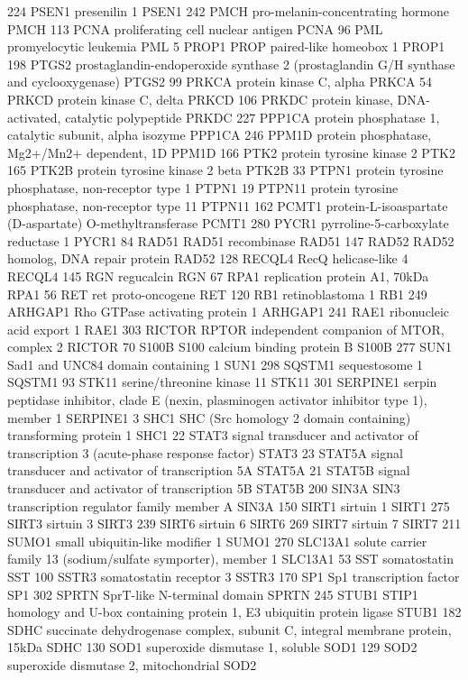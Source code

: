 224	PSEN1	presenilin 1	PSEN1
242	PMCH	pro-melanin-concentrating hormone	PMCH
113	PCNA	proliferating cell nuclear antigen	PCNA
96	PML	promyelocytic leukemia	PML
5	PROP1	PROP paired-like homeobox 1	PROP1
198	PTGS2	prostaglandin-endoperoxide synthase 2 (prostaglandin G/H synthase and cyclooxygenase)	PTGS2
99	PRKCA	protein kinase C, alpha	PRKCA
54	PRKCD	protein kinase C, delta	PRKCD
106	PRKDC	protein kinase, DNA-activated, catalytic polypeptide	PRKDC
227	PPP1CA	protein phosphatase 1, catalytic subunit, alpha isozyme	PPP1CA
246	PPM1D	protein phosphatase, Mg2+/Mn2+ dependent, 1D	PPM1D
166	PTK2	protein tyrosine kinase 2	PTK2
165	PTK2B	protein tyrosine kinase 2 beta	PTK2B
33	PTPN1	protein tyrosine phosphatase, non-receptor type 1	PTPN1
19	PTPN11	protein tyrosine phosphatase, non-receptor type 11	PTPN11
162	PCMT1	protein-L-isoaspartate (D-aspartate) O-methyltransferase	PCMT1
280	PYCR1	pyrroline-5-carboxylate reductase 1	PYCR1
84	RAD51	RAD51 recombinase	RAD51
147	RAD52	RAD52 homolog, DNA repair protein	RAD52
128	RECQL4	RecQ helicase-like 4	RECQL4
145	RGN	regucalcin	RGN
67	RPA1	replication protein A1, 70kDa	RPA1
56	RET	ret proto-oncogene	RET
120	RB1	retinoblastoma 1	RB1
249	ARHGAP1	Rho GTPase activating protein 1	ARHGAP1
241	RAE1	ribonucleic acid export 1	RAE1
303	RICTOR	RPTOR independent companion of MTOR, complex 2	RICTOR
70	S100B	S100 calcium binding protein B	S100B
277	SUN1	Sad1 and UNC84 domain containing 1	SUN1
298	SQSTM1	sequestosome 1	SQSTM1
93	STK11	serine/threonine kinase 11	STK11
301	SERPINE1	serpin peptidase inhibitor, clade E (nexin, plasminogen activator inhibitor type 1), member 1	SERPINE1
3	SHC1	SHC (Src homology 2 domain containing) transforming protein 1	SHC1
22	STAT3	signal transducer and activator of transcription 3 (acute-phase response factor)	STAT3
23	STAT5A	signal transducer and activator of transcription 5A	STAT5A
21	STAT5B	signal transducer and activator of transcription 5B	STAT5B
200	SIN3A	SIN3 transcription regulator family member A	SIN3A
150	SIRT1	sirtuin 1	SIRT1
275	SIRT3	sirtuin 3	SIRT3
239	SIRT6	sirtuin 6	SIRT6
269	SIRT7	sirtuin 7	SIRT7
211	SUMO1	small ubiquitin-like modifier 1	SUMO1
270	SLC13A1	solute carrier family 13 (sodium/sulfate symporter), member 1	SLC13A1
53	SST	somatostatin	SST
100	SSTR3	somatostatin receptor 3	SSTR3
170	SP1	Sp1 transcription factor	SP1
302	SPRTN	SprT-like N-terminal domain	SPRTN
245	STUB1	STIP1 homology and U-box containing protein 1, E3 ubiquitin protein ligase	STUB1
182	SDHC	succinate dehydrogenase complex, subunit C, integral membrane protein, 15kDa	SDHC
130	SOD1	superoxide dismutase 1, soluble	SOD1
129	SOD2	superoxide dismutase 2, mitochondrial	SOD2
